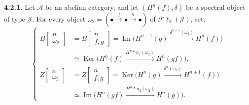 \medskip\noindent\textbf{4.2.1.}\quad
Let $\mathcal A$ be an abelian category, and let $(H^n(f),\delta)$ be a
spectral object of type $\mathcal J$. For every object
$\omega_2=(\mathord\bullet\xrightarrow f\mathord\bullet\xrightarrow g\mathord\bullet)$
of $\mathcal{F}\ell_2(\mathcal J)$, set:
\[
\left\{
\begin{aligned}
B\!\left[\begin{smallmatrix}n\\\omega_2\end{smallmatrix}\right]
&=B\!\left[\begin{smallmatrix}n\\f,g\end{smallmatrix}\right]
=\operatorname{Im}\bigl(H^{n-1}(g)
  \xrightarrow{\delta^{n-1}(\omega_2)}H^n(f)\bigr)\\
&\simeq\operatorname{Ker}\bigl(H^n(f)
  \xrightarrow{H^n*u_1(\omega_2)}H^n(gf)\bigr),\\[2pt]
Z\!\left[\begin{smallmatrix}n\\\omega_2\end{smallmatrix}\right]
&=Z\!\left[\begin{smallmatrix}n\\f,g\end{smallmatrix}\right]
=\operatorname{Ker}\bigl(H^n(g)
  \xrightarrow{\delta^n(\omega_2)}H^{n+1}(f)\bigr)\\
&\simeq\operatorname{Im}\bigl(H^n(gf)
  \xrightarrow{H^n*u_2(\omega_2)}H^n(g)\bigr).
\end{aligned}
\right.
\tag{4.2.1.1}
\]
\endgroup

